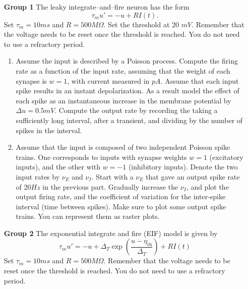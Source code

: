 \documentclass[12pt]{article}
\begin{document}
\begin{enumerate}
\item[\bf Group 1]  The leaky integrate--and--fire neuron has the form
$$
\tau_m u' = - u + R I(t).
$$
Set $\tau_m = 10 ms$ and $R = 500M \Omega$.  Set the threshold at 20 $mV$. Remember that the voltage needs to be reset once the threshold is reached.  You do not need to use a refractory period.   

\begin{enumerate}
\item Assume the input is described by a Poisson process. Compute the firing rate as a function of the input rate, assuming that the weight of each synapse is $w = 1$,
with current measured in $pA$.  Assume that each input spike results in an instant depolarization.  As a result model the effect of each spike as  an instantaneous increase in the membrane potential
by $\Delta u = 0.5mV$.  Compute the output rate by recording the taking a sufficiently long interval, after a transient, and dividing by the 
number of spikes in the interval.
\item Assume that the input is composed of two independent Poisson spike trains.  One corresponds to inputs with synapse weights $w = 1$ (excitatory inputs), and the other with $w = -1$ (inhibitory inputs).  Denote the two input rates by $\nu_E$ and $\nu_I$. Start with a $\nu_E$ that gave an output spike rate of 20$Hz$ in the previous part. Gradually increase the $\nu_I$, and plot the output firing rate, and the coefficient of variation for the inter-spike interval (time between spikes).  Make sure to plot some output spike trains. You can represent them as raster plots.
\end{enumerate}

\item[\bf Group 2] 
The exponential integrate and fire (EIF) model is given by 
\begin{equation} \label{E:EIF}
\tau_m u' = - u + \Delta_T \exp \left( \frac{u - \eta_{\text{rh}}}{\Delta_T} \right) + R I(t) 
\end{equation}
Set $\tau_m = 10 ms$ and $R = 500M \Omega$. Remember that the voltage needs to be reset once the threshold is reached.  You do not need to use a refractory period.   


\end{enumerate}
\end{document}
